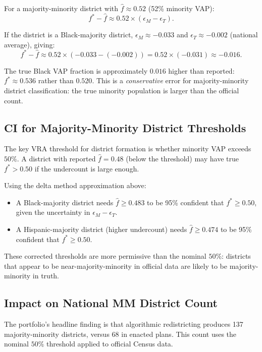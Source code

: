 For a majority-minority district with $\hat{f} \approx 0.52$
(52\% minority VAP):
\begin{equation}
  f^* - \hat{f} \approx 0.52 \times (\epsilon_M - \epsilon_T).
\end{equation}

If the district is a Black-majority district, $\epsilon_M \approx -0.033$
and $\epsilon_T \approx -0.002$ (national average), giving:
\begin{equation}
  f^* - \hat{f} \approx 0.52 \times (-0.033 - (-0.002))
               = 0.52 \times (-0.031)
               \approx -0.016.
\end{equation}

The true Black VAP fraction is approximately $0.016$ higher than
reported: $f^* \approx 0.536$ rather than $0.520$. This is a
\emph{conservative} error for majority-minority district classification:
the true minority population is larger than the official count.

\subsection{CI for Majority-Minority District Thresholds}

The key VRA threshold for district formation is whether minority VAP
exceeds $50\%$. A district with reported $\hat{f} = 0.48$ (below the
threshold) may have true $f^* > 0.50$ if the undercount is large enough.

Using the delta method approximation above:
\begin{itemize}
  \item A Black-majority district needs $\hat{f} \geq 0.483$ to be
    95\% confident that $f^* \geq 0.50$, given the uncertainty in
    $\epsilon_M - \epsilon_T$.
  \item A Hispanic-majority district (higher undercount) needs
    $\hat{f} \geq 0.474$ to be 95\% confident that $f^* \geq 0.50$.
\end{itemize}

These corrected thresholds are more permissive than the nominal $50\%$:
districts that appear to be near-majority-minority in official data
are likely to be majority-minority in truth.

\subsection{Impact on National MM District Count}

The portfolio's headline finding \citep{dellalibera2026d0} is that
algorithmic redistricting produces 137 majority-minority districts,
versus 68 in enacted plans. This count uses the nominal $50\%$
threshold applied to official Census data.


